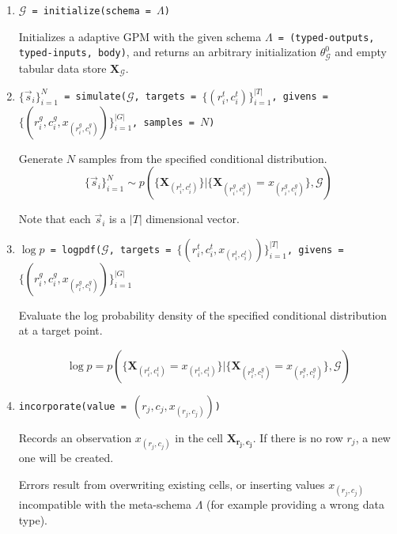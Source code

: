 \documentclass[10pt,letterpaper]{article}
\newcommand{\set}[1]{\{#1\}}
\newcommand{\G}{\mathcal{G}}
\begin{document}
\begin{enumerate}

\item \texttt{$\G$ = initialize(schema = $\Lambda$)}

    Initializes a adaptive GPM with the given schema \texttt{$\Lambda$ =
    (typed-outputs, typed-inputs, body)}, and returns an arbitrary
    initialization $\theta_\G^0$ and empty tabular data store
    $\mathbf{X}_\G$.


\item \texttt{$\set{\vec{s}_i}_{i=1}^N$ =
    simulate($\G$, targets = $\set{(r_i^t,c_i^t)}_{i=1}^{|T|}$, givens
    = $\set{(r_i^g, c_i^g, x_{(r_i^g, c_i^g)})}_{i=1}^{|G|}$, samples = $N$)}

    Generate $N$ samples from the specified conditional distribution.
    $$
    \set{\vec{s}_i}_{i=1}^N \sim p( \set{ \mathbf{X}_{(r_i^t,c_i^t)} } |
    \set{ \mathbf{X}_{(r_i^g,c_i^g)} = x_{(r_i^g,c_i^g)} }, \G)
    $$

    Note that each $\vec{s}_i$ is a $|T|$ dimensional vector.

\item \texttt{$\log p$ =
    logpdf($\G$, targets = $\set{(r_i^t, c_i^t, x_{(r_i^t,
    c_i^t)})}_{i=1}^{|T|}$, givens = $\set{(r_i^g, c_i^g, x_{(r_i^g,
    c_i^g)})}_{i=1}^{|G|}$}

    Evaluate the log probability density of the specified conditional
    distribution at a target point.

    $$
    \log p = p( \set{ \mathbf{X}_{(r_i^t,c_i^t)} = x_{(r_i^t,c_i^t)} } |
    \set{ \mathbf{X}_{(r_i^g,c_i^g)} = x_{(r_i^g,c_i^g)} }, \G)
    $$

\item \texttt{incorporate(value = $(r_j,c_j,x_{(r_j,c_j)})$)}

    Records an observation $x_{(r_j,c_j)}$ in the cell $\mathbf{X_{r_j,c_j}}$.
    If there is no row $r_j$, a new one will be created.

    Errors result from overwriting existing cells, or inserting values
    $x_{(r_j,c_j)}$ incompatible with the meta-schema $\Lambda$ (for example
    providing a wrong data type).


\end{enumerate}
\end{document}
